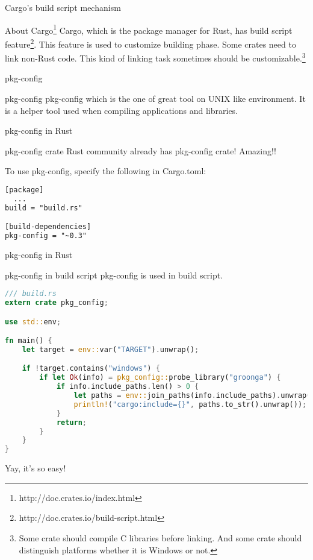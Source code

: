 \documentclass[12pt, unicode]{beamer}
\begin{document}
\begin{frame}{Cargo's build script mechanism}
\begin{block}{About Cargo\footnote[frame]{http://doc.crates.io/index.html}}
  Cargo, which is the package manager for Rust, has build script feature\footnote[frame]{http://doc.crates.io/build-script.html}.
  \newline
  This feature is used to customize building phase.
  \newline
  Some crates need to link non-Rust code. This kind of linking task sometimes should be customizable.\footnote[frame]{Some crate should compile C libraries before linking. And some crate should distinguish platforms whether it is Windows or not.}
\end{block}
\end{frame}

\begin{frame}{pkg-config}
  \begin{block}{pkg-config}
    pkg-config which is the one of great tool on UNIX like environment.
    \newline
    It is a helper tool used when compiling applications and libraries.
  \end{block}
\end{frame}

\begin{frame}[fragile]{pkg-config in Rust}
  \begin{block}{pkg-config crate}
    Rust community already has pkg-config crate! Amazing!!
  \end{block}
  To use pkg-config, specify the following in Cargo.toml:
\begin{lstlisting}[language={XML},basicstyle=\ttfamily\Small]
[package]
  ...
build = "build.rs"

[build-dependencies]
pkg-config = "~0.3"
\end{lstlisting}
\end{frame}

\newcommand\XSmall{\fontsize{7}{7}\selectfont}
\begin{frame}[fragile]{pkg-config in Rust}
  \begin{block}{pkg-config in build script}
    pkg-config is used in build script.
  \end{block}
  \begin{lstlisting}[language={Rust},basicstyle=\ttfamily\XSmall]
/// build.rs
extern crate pkg_config;

use std::env;

fn main() {
    let target = env::var("TARGET").unwrap();

    if !target.contains("windows") {
        if let Ok(info) = pkg_config::probe_library("groonga") {
            if info.include_paths.len() > 0 {
                let paths = env::join_paths(info.include_paths).unwrap();
                println!("cargo:include={}", paths.to_str().unwrap());
            }
            return;
        }
    }
}
  \end{lstlisting}
  Yay, it's so easy!
\end{frame}
\end{document}
